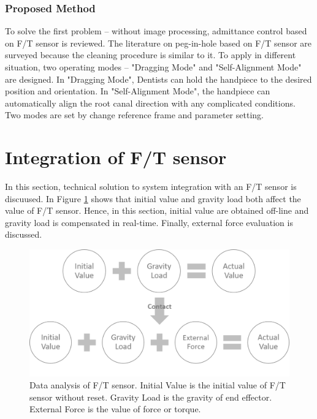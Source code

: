 \subsubsection{Proposed Method}
\hspace*{6mm}To solve the first problem -- without image processing, admittance control based on F/T sensor is reviewed. The literature on peg-in-hole based on F/T sensor  \cite{7743375, pihwithflex, Xu201511, 8294275} are surveyed because the cleaning procedure is similar to it. To apply in different situation, two operating modes -- "Dragging Mode" and "Self-Alignment Mode" are designed. In "Dragging Mode", Dentists can hold the handpiece to the desired position and orientation. In "Self-Alignment Mode", the handpiece can automatically align the root canal direction with any complicated conditions. Two modes are set by change reference frame and parameter setting.
\section{Integration of F/T sensor}
\label{sec:grav compen}
\hspace*{6mm}In this section, technical solution to system integration with an F/T sensor is discuused. In Figure \ref{fig:gravity compensation} shows that initial value and gravity load both affect the value of F/T sensor. Hence, in this section, initial value are obtained off-line and gravity load is compensated in real-time. Finally, external force evaluation is discussed.
\begin{figure}[htbp]
\begin{center}
\includegraphics[width=1\linewidth]{Images/gravity compensation.png}
\caption{
Data analysis of F/T sensor. Initial Value is the initial value of F/T sensor without reset. Gravity Load is the gravity of end effector. External Force is the value of force or torque.
}\label{fig:gravity compensation}
\end{center}
\end{figure}
